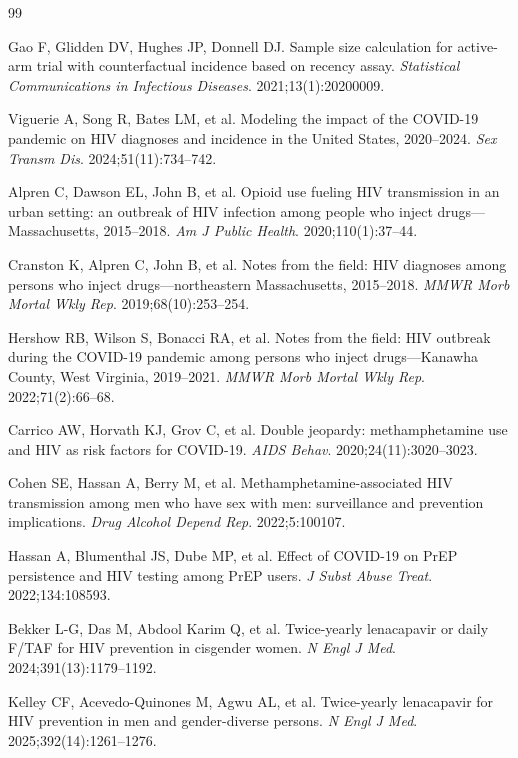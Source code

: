 \documentclass[11pt]{article}
\begin{document}
\begin{thebibliography}{99}
\small

 Gao F, Glidden DV, Hughes JP, Donnell DJ. Sample size calculation for active-arm trial with counterfactual incidence based on recency assay. \emph{Statistical Communications in Infectious Diseases}. 2021;13(1):20200009.

 Viguerie A, Song R, Bates LM, et al. Modeling the impact of the COVID-19 pandemic on HIV diagnoses and incidence in the United States, 2020--2024. \textit{Sex Transm Dis}. 2024;51(11):734--742.

 Alpren C, Dawson EL, John B, et al. Opioid use fueling HIV transmission in an urban setting: an outbreak of HIV infection among people who inject drugs---Massachusetts, 2015--2018. \emph{Am J Public Health}. 2020;110(1):37--44.

 Cranston K, Alpren C, John B, et al. Notes from the field: HIV diagnoses among persons who inject drugs---northeastern Massachusetts, 2015--2018. \emph{MMWR Morb Mortal Wkly Rep}. 2019;68(10):253--254.

 Hershow RB, Wilson S, Bonacci RA, et al. Notes from the field: HIV outbreak during the COVID-19 pandemic among persons who inject drugs---Kanawha County, West Virginia, 2019--2021. \emph{MMWR Morb Mortal Wkly Rep}. 2022;71(2):66--68.

 Carrico AW, Horvath KJ, Grov C, et al. Double jeopardy: methamphetamine use and HIV as risk factors for COVID-19. \emph{AIDS Behav}. 2020;24(11):3020--3023.

 Cohen SE, Hassan A, Berry M, et al. Methamphetamine-associated HIV transmission among men who have sex with men: surveillance and prevention implications. \emph{Drug Alcohol Depend Rep}. 2022;5:100107.

 Hassan A, Blumenthal JS, Dube MP, et al. Effect of COVID-19 on PrEP persistence and HIV testing among PrEP users. \emph{J Subst Abuse Treat}. 2022;134:108593.

 Bekker L-G, Das M, Abdool Karim Q, et al. Twice-yearly lenacapavir or daily F/TAF for HIV prevention in cisgender women. \emph{N Engl J Med}. 2024;391(13):1179--1192.

 Kelley CF, Acevedo-Quinones M, Agwu AL, et al. Twice-yearly lenacapavir for HIV prevention in men and gender-diverse persons. \emph{N Engl J Med}. 2025;392(14):1261--1276.


\end{thebibliography}
\end{document}
